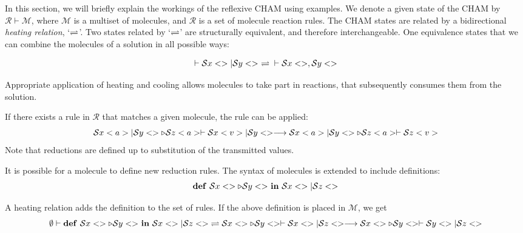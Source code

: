 In this section, we will briefly explain the workings of the reflexive CHAM
using examples.  We denote a given state of the CHAM by $\mathcal{R} \vdash
\mathcal{M}$, where $\mathcal{M}$ is a multiset of molecules, and $\mathcal{R}$
is a set of molecule reaction rules. The CHAM states are related by a
bidirectional \emph{heating relation}, `$\rightleftharpoons$'. Two states related by
`$\rightleftharpoons$' are structurally equivalent, and therefore interchangeable.  One
equivalence states that we can combine the molecules of a solution in all
possible ways:

$$
  \vdash \S x<> | \S y<> \ \HeatCool{} \vdash \S x<>, \S y<>
$$

Appropriate application of heating and cooling allows molecules to take part in
reactions, that subsequently consumes them from the solution.

If there exists a rule in $\mathcal{R}$ that matches a given molecule, the rule
can be applied:
$$
  \mathcal{S} x<a> | \mathcal{S} y<> \triangleright \mathcal{S} z<a> \vdash \mathcal{S} x<v> | \mathcal{S} y<>
  \longrightarrow \mathcal{S} x<a> | \mathcal{S} y<> \triangleright \mathcal{S} z<a> \vdash \mathcal{S} z<v>
$$
Note that reductions are defined up to substitution of the transmitted values.

It is possible for a molecule to define new reduction rules. The syntax of
molecules is extended to include definitions:
$$
  \textrm{\textbf{def}}~{\mathcal{S} x<> \triangleright \mathcal{S} y<>}~\textrm{\textbf{in}}~{\mathcal{S} x<> | \mathcal{S} z<>}
$$

A heating relation adds the definition to the set of rules. If the above
definition is placed in $\mathcal{M}$, we get
$$
 \emptyset \vdash \Def \S x<> \triangleright \S y<> in \S x<> | \S z<>.
 \HeatCool \S x<> \triangleright \S y<> \vdash \S x<> | \S z<>
 \React \S x<> \triangleright \S y<> \vdash \S y<> | \S z<>
$$
